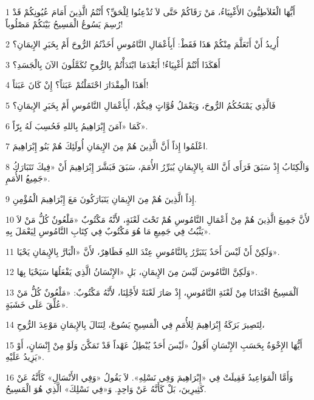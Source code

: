 \par 1 أَيُّهَا الْغَلاَطِيُّونَ الأَغْبِيَاءُ، مَنْ رَقَاكُمْ حَتَّى لاَ تُذْعِنُوا لِلْحَقِّ؟ أَنْتُمُ الَّذِينَ أَمَامَ عُيُونِكُمْ قَدْ رُسِمَ يَسُوعُ الْمَسِيحُ بَيْنَكُمْ مَصْلُوباً!
\par 2 أُرِيدُ أَنْ أَتَعَلَّمَ مِنْكُمْ هَذَا فَقَطْ: أَبِأَعْمَالِ النَّامُوسِ أَخَذْتُمُ الرُّوحَ أَمْ بِخَبَرِ الإِيمَانِ؟
\par 3 أَهَكَذَا أَنْتُمْ أَغْبِيَاءُ! أَبَعْدَمَا ابْتَدَأْتُمْ بِالرُّوحِ تُكَمَّلُونَ الآنَ بِالْجَسَدِ؟
\par 4 أَهَذَا الْمِقْدَارَ احْتَمَلْتُمْ عَبَثاً؟ إِنْ كَانَ عَبَثاً!
\par 5 فَالَّذِي يَمْنَحُكُمُ الرُّوحَ، وَيَعْمَلُ قُوَّاتٍ فِيكُمْ، أَبِأَعْمَالِ النَّامُوسِ أَمْ بِخَبَرِ الإِيمَانِ؟
\par 6 كَمَا «آمَنَ إِبْرَاهِيمُ بِاللهِ فَحُسِبَ لَهُ بِرّاً».
\par 7 اعْلَمُوا إِذاً أَنَّ الَّذِينَ هُمْ مِنَ الإِيمَانِ أُولَئِكَ هُمْ بَنُو إِبْرَاهِيمَ.
\par 8 وَالْكِتَابُ إِذْ سَبَقَ فَرَأَى أَنَّ اللهَ بِالإِيمَانِ يُبَرِّرُ الأُمَمَ، سَبَقَ فَبَشَّرَ إِبْرَاهِيمَ أَنْ «فِيكَ تَتَبَارَكُ جَمِيعُ الأُمَمِ».
\par 9 إِذاً الَّذِينَ هُمْ مِنَ الإِيمَانِ يَتَبَارَكُونَ مَعَ إِبْرَاهِيمَ الْمُؤْمِنِ.
\par 10 لأَنَّ جَمِيعَ الَّذِينَ هُمْ مِنْ أَعْمَالِ النَّامُوسِ هُمْ تَحْتَ لَعْنَةٍ، لأَنَّهُ مَكْتُوبٌ «مَلْعُونٌ كُلُّ مَنْ لاَ يَثْبُتُ فِي جَمِيعِ مَا هُوَ مَكْتُوبٌ فِي كِتَابِ النَّامُوسِ لِيَعْمَلَ بِهِ».
\par 11 وَلَكِنْ أَنْ لَيْسَ أَحَدٌ يَتَبَرَّرُ بِالنَّامُوسِ عِنْدَ اللهِ فَظَاهِرٌ، لأَنَّ «الْبَارَّ بِالإِيمَانِ يَحْيَا».
\par 12 وَلَكِنَّ النَّامُوسَ لَيْسَ مِنَ الإِيمَانِ، بَلِ «الإِنْسَانُ الَّذِي يَفْعَلُهَا سَيَحْيَا بِهَا».
\par 13 اَلْمَسِيحُ افْتَدَانَا مِنْ لَعْنَةِ النَّامُوسِ، إِذْ صَارَ لَعْنَةً لأَجْلِنَا، لأَنَّهُ مَكْتُوبٌ: «مَلْعُونٌ كُلُّ مَنْ عُلِّقَ عَلَى خَشَبَةٍ».
\par 14 لِتَصِيرَ بَرَكَةُ إِبْرَاهِيمَ لِلأُمَمِ فِي الْمَسِيحِ يَسُوعَ، لِنَنَالَ بِالإِيمَانِ مَوْعِدَ الرُّوحِ،
\par 15 أَيُّهَا الإِخْوَةُ بِحَسَبِ الإِنْسَانِ أَقُولُ «لَيْسَ أَحَدٌ يُبْطِلُ عَهْداً قَدْ تَمَكَّنَ وَلَوْ مِنْ إِنْسَانٍ، أَوْ يَزِيدُ عَلَيْهِ».
\par 16 وَأَمَّا الْمَوَاعِيدُ فَقِيلَتْ فِي «إِبْرَاهِيمَ وَفِي نَسْلِهِ». لاَ يَقُولُ «وَفِي الأَنْسَالِ» كَأَنَّهُ عَنْ كَثِيرِينَ، بَلْ كَأَنَّهُ عَنْ وَاحِدٍ. وَ«فِي نَسْلِكَ» الَّذِي هُوَ الْمَسِيحُ.
